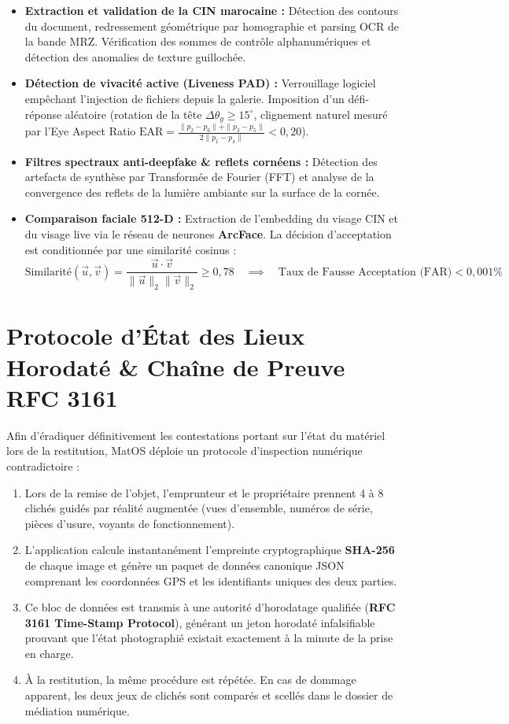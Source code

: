 \documentclass[11pt,a4paper]{report}
\begin{document}
\begin{itemize}[leftmargin=*]
    \item \textbf{Extraction et validation de la CIN marocaine :} Détection des contours du document, redressement géométrique par homographie et parsing OCR de la bande MRZ. Vérification des sommes de contrôle alphanumériques et détection des anomalies de texture guillochée.
    \item \textbf{Détection de vivacité active (Liveness PAD) :} Verrouillage logiciel empêchant l'injection de fichiers depuis la galerie. Imposition d'un défi-réponse aléatoire (rotation de la tête $\Delta\theta_y \ge 15^\circ$, clignement naturel mesuré par l'Eye Aspect Ratio $\text{EAR} = \frac{\|p_2-p_6\| + \|p_3-p_5\|}{2\|p_1-p_4\|} < 0,20$).
    \item \textbf{Filtres spectraux anti-deepfake \& reflets cornéens :} Détection des artefacts de synthèse par Transformée de Fourier (FFT) et analyse de la convergence des reflets de la lumière ambiante sur la surface de la cornée.
    \item \textbf{Comparaison faciale 512-D :} Extraction de l'embedding du visage CIN et du visage live via le réseau de neurones \textbf{ArcFace}. La décision d'acceptation est conditionnée par une similarité cosinus :
    $$\text{Similarité}(\vec{u}, \vec{v}) = \frac{\vec{u} \cdot \vec{v}}{\|\vec{u}\|_2 \|\vec{v}\|_2} \ge 0,78 \quad \implies \quad \text{Taux de Fausse Acceptation (FAR)} < 0,001\%$$
\end{itemize}

\section{Protocole d'État des Lieux Horodaté \& Chaîne de Preuve RFC 3161}
Afin d'éradiquer définitivement les contestations portant sur l'état du matériel lors de la restitution, MatOS déploie un protocole d'inspection numérique contradictoire :
\begin{enumerate}[leftmargin=*]
    \item Lors de la remise de l'objet, l'emprunteur et le propriétaire prennent 4 à 8 clichés guidés par réalité augmentée (vues d'ensemble, numéros de série, pièces d'usure, voyants de fonctionnement).
    \item L'application calcule instantanément l'empreinte cryptographique \textbf{SHA-256} de chaque image et génère un paquet de données canonique JSON comprenant les coordonnées GPS et les identifiants uniques des deux parties.
    \item Ce bloc de données est transmis à une autorité d'horodatage qualifiée (\textbf{RFC 3161 Time-Stamp Protocol}), générant un jeton horodaté infalsifiable prouvant que l'état photographié existait exactement à la minute de la prise en charge.
    \item À la restitution, la même procédure est répétée. En cas de dommage apparent, les deux jeux de clichés sont comparés et scellés dans le dossier de médiation numérique.
\end{enumerate}
\end{document}
